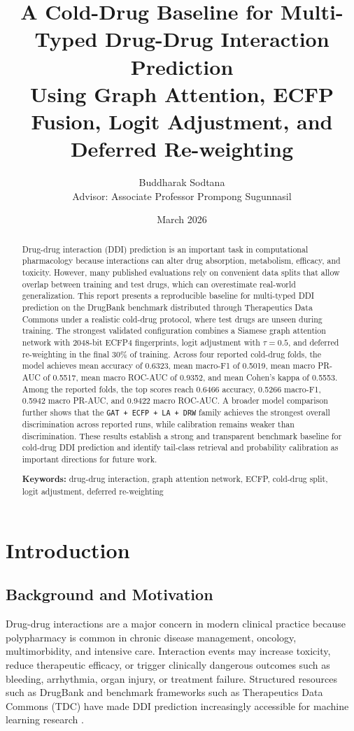 \documentclass[12pt,a4paper]{report}
\title{A Cold-Drug Baseline for Multi-Typed Drug-Drug Interaction Prediction\\Using Graph Attention, ECFP Fusion, Logit Adjustment, and Deferred Re-weighting}
\author{Buddharak Sodtana\\[1em]Advisor: Associate Professor Prompong Sugunnasil}
\date{March 2026}
\begin{document}
\maketitle
{}

\begin{abstract}
Drug-drug interaction (DDI) prediction is an important task in computational pharmacology because interactions can alter drug absorption, metabolism, efficacy, and toxicity. However, many published evaluations rely on convenient data splits that allow overlap between training and test drugs, which can overestimate real-world generalization. This report presents a reproducible baseline for multi-typed DDI prediction on the DrugBank benchmark distributed through Therapeutics Data Commons under a realistic cold-drug protocol, where test drugs are unseen during training. The strongest validated configuration combines a Siamese graph attention network with 2048-bit ECFP4 fingerprints, logit adjustment with \(\tau = 0.5\), and deferred re-weighting in the final 30\% of training. Across four reported cold-drug folds, the model achieves mean accuracy of 0.6323, mean macro-F1 of 0.5019, mean macro PR-AUC of 0.5517, mean macro ROC-AUC of 0.9352, and mean Cohen's kappa of 0.5553. Among the reported folds, the top scores reach 0.6466 accuracy, 0.5266 macro-F1, 0.5942 macro PR-AUC, and 0.9422 macro ROC-AUC. A broader model comparison further shows that the \texttt{GAT + ECFP + LA + DRW} family achieves the strongest overall discrimination across reported runs, while calibration remains weaker than discrimination. These results establish a strong and transparent benchmark baseline for cold-drug DDI prediction and identify tail-class retrieval and probability calibration as important directions for future work.

\noindent\textbf{Keywords:} drug-drug interaction, graph attention network, ECFP, cold-drug split, logit adjustment, deferred re-weighting
\end{abstract}

\tableofcontents
\listoftables
\clearpage
{}

\chapter{Introduction}
\section{Background and Motivation}
Drug-drug interactions are a major concern in modern clinical practice because polypharmacy is common in chronic disease management, oncology, multimorbidity, and intensive care. Interaction events may increase toxicity, reduce therapeutic efficacy, or trigger clinically dangerous outcomes such as bleeding, arrhythmia, organ injury, or treatment failure. Structured resources such as DrugBank and benchmark frameworks such as Therapeutics Data Commons (TDC) have made DDI prediction increasingly accessible for machine learning research \cite{wishart2018drugbank, huang2021tdc}.
\end{document}
